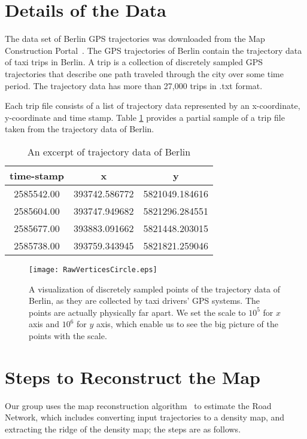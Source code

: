 \documentclass[11pt]{article}
\begin{document}
\section*{Details of the Data}
\par %
The data set of Berlin GPS trajectories was downloaded from the Map Construction Portal~\cite{link}. The GPS trajectories of Berlin contain the trajectory data of taxi trips in Berlin. A trip is a collection of discretely sampled GPS trajectories that describe one path traveled through the city over some time period. The trajectory data has more than 27,000 trips in .txt format. 
\par
Each trip file consists of a list of trajectory data represented by an x-coordinate, y-coordinate and time stamp. Table \ref{table:questions} provides a partial sample of a trip file taken from the trajectory data of Berlin.
\begin{table}[h!]
\begin{center}
\begin{tabular}{ |c |c| c| }
\hline
  time-stamp & x & y    \\ \hline
  2585542.00 & 393742.586772 & 5821049.184616    \\ \hline
  2585604.00 & 393747.949682 & 5821296.284551  \\  \hline
  2585677.00 & 393883.091662 & 5821448.203015  \\ \hline
  2585738.00 & 393759.343945 & 5821821.259046  \\ \hline
\end{tabular}
\end{center}
\caption{An excerpt of trajectory data of Berlin}
\label{table:questions}
\end{table}





\begin{figure}[H]
  \caption{A visualization of discretely sampled points of the trajectory data of Berlin, as they are collected by taxi drivers' GPS systems. The points are actually physically far apart. We set the scale to $10^5$ for $x$ axis and $10^6$ for $y$ axis, which enable us to see the big picture of the points with the scale.}
  \centering
 \texttt{[image: RawVerticesCircle.eps]} 
\end{figure}

\section*{Steps to Reconstruct the Map}
\par
Our group uses the map reconstruction algorithm~\cite{Wang15} to estimate the Road Network, which includes converting input trajectories to a density map, and  extracting the ridge of the 
density map; the  steps are as follows.   
\end{document}
